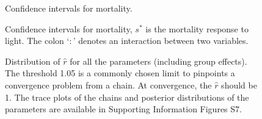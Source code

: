 \documentclass[letterpaper, 12pt]{article}
\newcommand {\s}{{s}^{*}}
\begin{document}
\begin{figure}
	\centering
	
	\caption[Confidence intervals for mortality 2]{Confidence intervals for mortality. \label{fig::confInt_m_2}}
\end{figure}

\begin{figure}
	\centering
	
	\caption[Confidence intervals for mortality 3]{Confidence intervals for mortality, $ \s $ is the mortality response to light. The colon `$ : $' denotes an interaction between two variables. \label{fig::confInt_m_3}}
\end{figure}

\begin{figure}[h]
	\centering
	
	\caption[Distribution of $ \hat{r} $]{Distribution of $ \hat{r} $ for all the parameters (including group effects). The threshold 1.05 is a commonly chosen limit to pinpoints a convergence problem from a chain. At convergence, the $ \hat{r} $ should be 1. The trace plots of the chains and posterior distributions of the parameters are available in Supporting Information Figures S7. \label{fig::rhat_conv}}
\end{figure}
\end{document}
